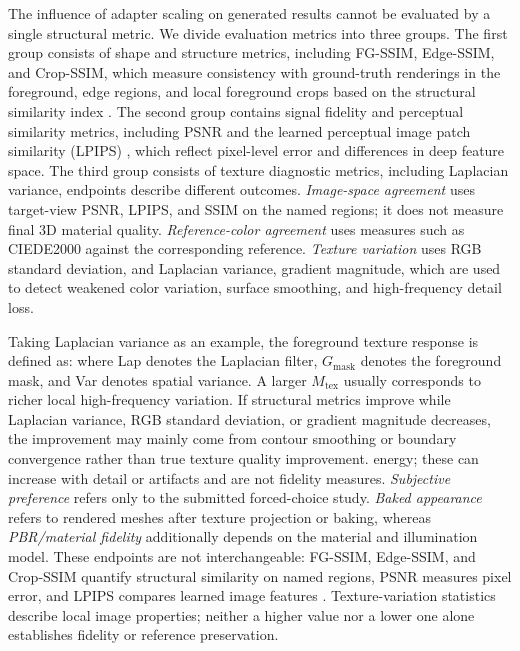 \documentclass[times,twocolumn,final]{elsarticle}
\providecommand{\DIFadd}[1]{{\protect\color{blue} \sf #1}} %
\providecommand{\DIFdel}[1]{{\protect\color{red} \scriptsize #1}} %
\providecommand{\DIFaddbegin}{} %
\providecommand{\DIFaddend}{} %
\providecommand{\DIFdelbegin}{} %
\providecommand{\DIFdelend}{} %
\begin{document}
The \DIFdelbegin \DIFdel{influence of adapter scaling on generated results cannot be evaluated by a single structural metric. We divide evaluation metrics into three groups. The first group consists of shape and structure metrics, including FG-SSIM, Edge-SSIM, and Crop-SSIM, which measure consistency with ground-truth renderings in the foreground, edge regions, and local foreground crops based on the structural similarity index \cite{wang2004ssim}. The second group contains signal fidelity and perceptual similarity metrics, including PSNR and the learned perceptual image patch similarity (LPIPS) \cite{zhang2018lpips}, which reflect pixel-level error and differences in deep feature space. The third group consists of texture diagnostic metrics, including Laplacian variance, }\DIFdelend \DIFaddbegin \DIFadd{endpoints describe different outcomes. \emph{Image-space agreement} uses target-view PSNR, LPIPS, and SSIM on the named regions; it does not measure final 3D material quality. \emph{Reference-color agreement} uses measures such as CIEDE2000 against the corresponding reference. \emph{Texture variation} uses }\DIFaddend RGB standard deviation, \DIFdelbegin \DIFdel{and }\DIFdelend \DIFaddbegin \DIFadd{Laplacian variance, }\DIFaddend gradient magnitude, \DIFdelbegin \DIFdel{which are used to detect weakened color variation, surface smoothing, }\DIFdelend and high-frequency \DIFdelbegin \DIFdel{detail loss.
}%

\DIFdel{Taking Laplacian variance as an example, the foreground texture response is defined as:
}%
\DIFdel{where Lap denotes the Laplacian filter, $G_\text{mask}$ denotes the foreground mask, and Var denotes spatial variance. A larger $M_\text{tex}$ usually corresponds to richer local high-frequency variation. If structural metrics improve while Laplacian variance, RGB standard deviation, or gradient magnitude decreases, the improvement may mainly come from contour smoothing or boundary convergence rather than true texture quality improvement. }\DIFdelend \DIFaddbegin \DIFadd{energy; these can increase with detail or artifacts and are not fidelity measures. \emph{Subjective preference} refers only to the submitted forced-choice study. \emph{Baked appearance} refers to rendered meshes after texture projection or baking, whereas \emph{PBR/material fidelity} additionally depends on the material and illumination model. These endpoints are not interchangeable: FG-SSIM, Edge-SSIM, and Crop-SSIM quantify structural similarity on named regions, PSNR measures pixel error, and LPIPS compares learned image features \cite{wang2004ssim,zhang2018lpips}. Texture-variation statistics describe local image properties; neither a higher value nor a lower one alone establishes fidelity or reference preservation.
}\DIFaddend
\end{document}
